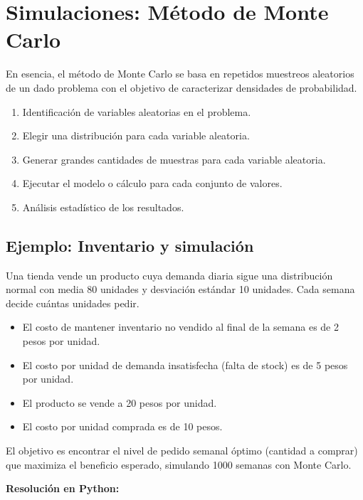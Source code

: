 \documentclass[12pt]{article}
\begin{document}
\section{Simulaciones: Método de Monte Carlo}

En esencia, el método de Monte Carlo se basa en repetidos muestreos aleatorios de un dado problema con el objetivo de caracterizar densidades de probabilidad.

\begin{enumerate}
    \item Identificación de variables aleatorias en el problema.
    \item Elegir una distribución para cada variable aleatoria.
    \item Generar grandes cantidades de muestras para cada variable aleatoria.
    \item Ejecutar el modelo o cálculo para cada conjunto de valores.
    \item Análisis estadístico de los resultados.
\end{enumerate}

\subsection{Ejemplo: Inventario y simulación}

Una tienda vende un producto cuya demanda diaria sigue una distribución normal con media 80 unidades y desviación estándar 10 unidades. Cada semana decide cuántas unidades pedir.

\begin{itemize}
    \item El costo de mantener inventario no vendido al final de la semana es de 2 pesos por unidad.
    \item El costo por unidad de demanda insatisfecha (falta de stock) es de 5 pesos por unidad.
    \item El producto se vende a 20 pesos por unidad.
    \item El costo por unidad comprada es de 10 pesos.
\end{itemize}

El objetivo es encontrar el nivel de pedido semanal óptimo (cantidad a comprar) que maximiza el beneficio esperado, simulando 1000 semanas con Monte Carlo.

\textbf{Resolución en Python:}
\end{document}
